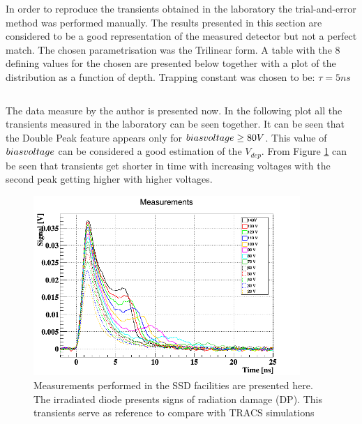 In order to reproduce the transients obtained in the laboratory the trial-and-error method was performed manually. The results presented in this section are considered to be a good representation of the measured detector but not a perfect match. The chosen \neff parametrisation was the Trilinear form. A table with the 8 defining values for the chosen \neff are presented below together with a plot of the \neff distribution as a function of depth. Trapping constant was chosen to be: $\tau = 5 ns$

\begin{centering}
\begin{tabular}{c}
	

\end{tabular}
\end{centering}

The data measure by the author is presented now. In the following plot all the transients measured in the laboratory can be seen together. It can be seen that the Double Peak feature appears only for $bias voltage \geq 80 V$. This value of $bias voltage$ can be considered a good estimation of the $V_{dep}$. From Figure \ref{fig:allTCT+} can be seen that transients get shorter in time with increasing voltages with the second peak getting higher with higher voltages. 

\begin{figure}[H]
	\centering
	\includegraphics[width=0.9\textwidth]{c1.png}
	\caption{Measurements performed in the SSD facilities are presented here. The irradiated diode presents signs of radiation damage (DP). This transients serve as reference to compare with TRACS simulations}
	\label{fig:allTCT+}
\end{figure}
				
